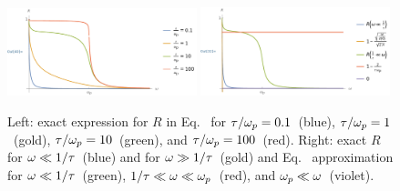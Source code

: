 {	\begin{figure}[t]
		\includegraphics[width=0.49\textwidth,trim=1.5cm 0 0 0,clip]{3c} \hfill
		\includegraphics[width=0.49\textwidth,trim=1.5cm 0 0 0,clip]{3c2}
		\caption{Left: exact expression for $R$ in Eq.~ for $\tau / \omega_p = 0.1$~(blue), $\tau / \omega_p = 1$~(gold), $\tau / \omega_p = 10$~(green), and $\tau / \omega_p = 100$~(red).  Right: exact $R$ for $\omega \ll 1 / \tau$~(blue) and for $\omega \gg 1 / \tau$~(gold) and Eq.~ approximation for $\omega \ll 1 / \tau$~(green), $1 / \tau \ll \omega \ll \omega_p$~(red), and $\omega_p \ll \omega$~(violet).}
		\label{f3c}
	\end{figure}
}